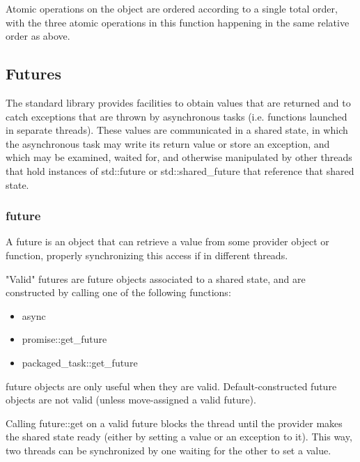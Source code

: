 \documentclass[UTF8,a4paper,12pt]{ctexbook}
\begin{document}
			Atomic operations on the object are ordered according to a single total order, with the three atomic operations in this function happening in the same relative order as above.			
	\subsection{Futures}
		The standard library provides facilities to obtain values that are returned and to catch exceptions that are thrown by asynchronous tasks (i.e. functions launched in separate threads). These values are communicated in a shared state, in which the asynchronous task may write its return value or store an exception, and which may be examined, waited for, and otherwise manipulated by other threads that hold instances of std::future or std::shared\_future that reference that shared state.
	
		\subsubsection{future}
			A future is an object that can retrieve a value from some provider object or function, properly synchronizing this access if in different threads.
			
			"Valid" futures are future objects associated to a shared state, and are constructed by calling one of the following functions:
			\begin{itemize}[itemindent = 1em]
				\item async
				\item promise::get\_future
				\item packaged\_task::get\_future
			\end{itemize}
			
			future objects are only useful when they are valid. Default-constructed future objects are not valid (unless move-assigned a valid future).
			
			Calling future::get on a valid future blocks the thread until the provider makes the shared state ready (either by setting a value or an exception to it). This way, two threads can be synchronized by one waiting for the other to set a value.
			
\end{document}
